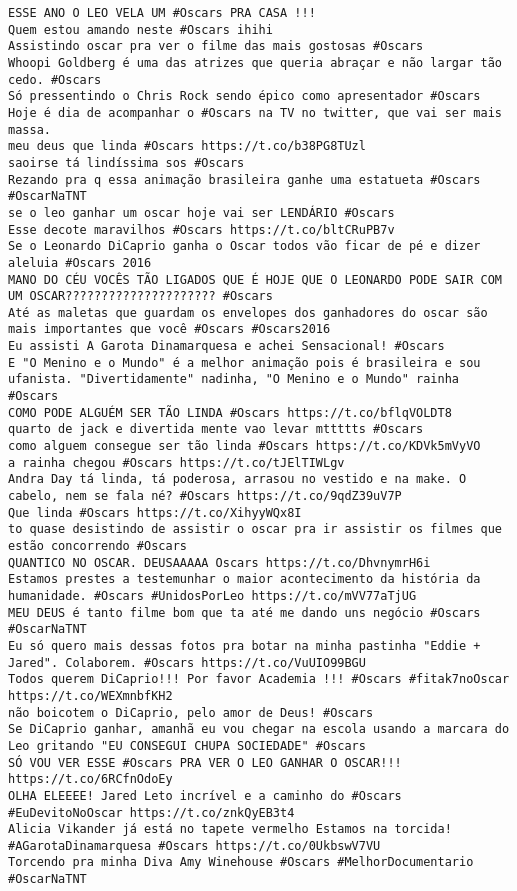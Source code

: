 \begin{lstlisting}[style=text, frame=single]
ESSE ANO O LEO VELA UM #Oscars PRA CASA !!!
Quem estou amando neste #Oscars ihihi
Assistindo oscar pra ver o filme das mais gostosas #Oscars
Whoopi Goldberg é uma das atrizes que queria abraçar e não largar tão cedo. #Oscars
Só pressentindo o Chris Rock sendo épico como apresentador #Oscars
Hoje é dia de acompanhar o #Oscars na TV no twitter, que vai ser mais massa.
meu deus que linda #Oscars https://t.co/b38PG8TUzl
saoirse tá lindíssima sos #Oscars
Rezando pra q essa animação brasileira ganhe uma estatueta #Oscars #OscarNaTNT
se o leo ganhar um oscar hoje vai ser LENDÁRIO #Oscars
Esse decote maravilhos #Oscars https://t.co/bltCRuPB7v
Se o Leonardo DiCaprio ganha o Oscar todos vão ficar de pé e dizer aleluia #Oscars 2016
MANO DO CÉU VOCÊS TÃO LIGADOS QUE É HOJE QUE O LEONARDO PODE SAIR COM UM OSCAR????????????????????? #Oscars
Até as maletas que guardam os envelopes dos ganhadores do oscar são mais importantes que você #Oscars #Oscars2016
Eu assisti A Garota Dinamarquesa e achei Sensacional! #Oscars
E "O Menino e o Mundo" é a melhor animação pois é brasileira e sou ufanista. "Divertidamente" nadinha, "O Menino e o Mundo" rainha #Oscars
COMO PODE ALGUÉM SER TÃO LINDA #Oscars https://t.co/bflqVOLDT8
quarto de jack e divertida mente vao levar mttttts #Oscars
como alguem consegue ser tão linda #Oscars https://t.co/KDVk5mVyVO
a rainha chegou #Oscars https://t.co/tJElTIWLgv
Andra Day tá linda, tá poderosa, arrasou no vestido e na make. O cabelo, nem se fala né? #Oscars https://t.co/9qdZ39uV7P
Que linda #Oscars https://t.co/XihyyWQx8I
to quase desistindo de assistir o oscar pra ir assistir os filmes que estão concorrendo #Oscars
QUANTICO NO OSCAR. DEUSAAAAA Oscars https://t.co/DhvnymrH6i
Estamos prestes a testemunhar o maior acontecimento da história da humanidade. #Oscars #UnidosPorLeo https://t.co/mVV77aTjUG
MEU DEUS é tanto filme bom que ta até me dando uns negócio #Oscars #OscarNaTNT
Eu só quero mais dessas fotos pra botar na minha pastinha "Eddie + Jared". Colaborem. #Oscars https://t.co/VuUIO99BGU
Todos querem DiCaprio!!! Por favor Academia !!! #Oscars #fitak7noOscar https://t.co/WEXmnbfKH2
não boicotem o DiCaprio, pelo amor de Deus! #Oscars
Se DiCaprio ganhar, amanhã eu vou chegar na escola usando a marcara do Leo gritando "EU CONSEGUI CHUPA SOCIEDADE" #Oscars
SÓ VOU VER ESSE #Oscars PRA VER O LEO GANHAR O OSCAR!!! https://t.co/6RCfnOdoEy
OLHA ELEEEE! Jared Leto incrível e a caminho do #Oscars #EuDevitoNoOscar https://t.co/znkQyEB3t4
Alicia Vikander já está no tapete vermelho Estamos na torcida! #AGarotaDinamarquesa #Oscars https://t.co/0UkbswV7VU
Torcendo pra minha Diva Amy Winehouse #Oscars #MelhorDocumentario #OscarNaTNT

\end{lstlisting}
